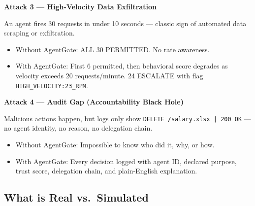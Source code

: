\documentclass[12pt, a4paper]{article}
\begin{document}
\textbf{Attack 3 — High-Velocity Data Exfiltration}

An agent fires 30 requests in under 10 seconds — classic sign of automated data
scraping or exfiltration.
\begin{itemize}[noitemsep]
  \item \textcolor{denyred}{Without AgentGate:} ALL 30 PERMITTED. No rate awareness.
  \item \textcolor{permitgreen}{With AgentGate:} First 6 permitted, then behavioral score degrades as velocity exceeds 20 requests/minute. 24 ESCALATE with flag \texttt{HIGH\_VELOCITY:23\_RPM}.
\end{itemize}

\textbf{Attack 4 — Audit Gap (Accountability Black Hole)}

Malicious actions happen, but logs only show \texttt{DELETE /salary.xlsx | 200 OK} — no
agent identity, no reason, no delegation chain.
\begin{itemize}[noitemsep]
  \item \textcolor{denyred}{Without AgentGate:} Impossible to know who did it, why, or how.
  \item \textcolor{permitgreen}{With AgentGate:} Every decision logged with agent ID, declared purpose, trust score, delegation chain, and plain-English explanation.
\end{itemize}

\subsection{What is Real vs.\ Simulated}
\end{document}
